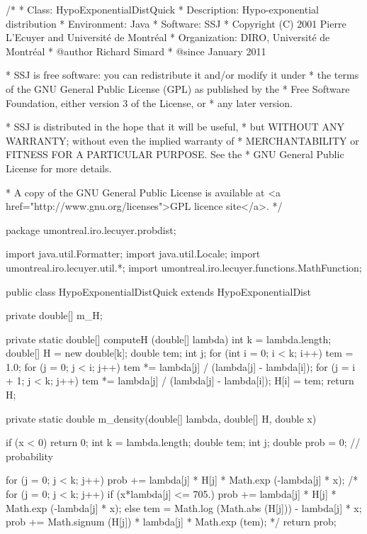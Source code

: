 \begin{code}\begin{hide}
/*
 * Class:        HypoExponentialDistQuick
 * Description:  Hypo-exponential distribution
 * Environment:  Java
 * Software:     SSJ 
 * Copyright (C) 2001  Pierre L'Ecuyer and Université de Montréal
 * Organization: DIRO, Université de Montréal
 * @author       Richard Simard
 * @since        January 2011

 * SSJ is free software: you can redistribute it and/or modify it under
 * the terms of the GNU General Public License (GPL) as published by the
 * Free Software Foundation, either version 3 of the License, or
 * any later version.

 * SSJ is distributed in the hope that it will be useful,
 * but WITHOUT ANY WARRANTY; without even the implied warranty of
 * MERCHANTABILITY or FITNESS FOR A PARTICULAR PURPOSE.  See the
 * GNU General Public License for more details.

 * A copy of the GNU General Public License is available at
   <a href="http://www.gnu.org/licenses">GPL licence site</a>.
 */
\end{hide}
package umontreal.iro.lecuyer.probdist;
\begin{hide}
import java.util.Formatter;
import java.util.Locale;
import  umontreal.iro.lecuyer.util.*;
import umontreal.iro.lecuyer.functions.MathFunction;\end{hide}

public class HypoExponentialDistQuick extends HypoExponentialDist\begin{hide} {
   private double[] m_H;

   private static double[] computeH (double[] lambda) {
      int k = lambda.length;
      double[] H = new double[k];
      double tem;
      int j;
      for (int i = 0; i < k; i++) {
         tem = 1.0;
         for (j = 0; j < i; j++)
            tem *= lambda[j] / (lambda[j] - lambda[i]);
         for (j = i + 1; j < k; j++)
            tem *= lambda[j] / (lambda[j] - lambda[i]);
         H[i] = tem;
      }
      return H;
   }


   private static double m_density(double[] lambda, double[] H, double x) {
      if (x < 0)
         return 0;
      int k = lambda.length;
      double tem;
      int j;
      double prob = 0;            // probability

      for (j = 0; j < k; j++) {
         prob += lambda[j] * H[j] * Math.exp (-lambda[j] * x);
      }
/*
      for (j = 0; j < k; j++) {
         if (x*lambda[j] <= 705.) {
            prob += lambda[j] * H[j] * Math.exp (-lambda[j] * x);
         } else {
            tem = Math.log (Math.abs (H[j])) - lambda[j] * x;
            prob += Math.signum (H[j]) * lambda[j] * Math.exp (tem);
         }
      }
*/
      return prob;
   }


}
\end{hide}
\end{code}
